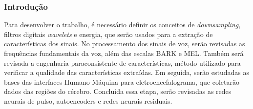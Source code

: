 \begin{frame}
	\frametitle{Introdução}
	\par Para desenvolver o trabalho, é necessário definir os conceitos de \textit{downsampling}, filtros digitais \textit{wavelets} e energia, que serão usados para a extração de características dos sinais. No processamento dos sinais de voz, serão revisadas as frequências fundamentais da voz, além das escalas BARK e MEL. Também será revisada a engenharia paraconsistente de características, método utilizado para verificar a qualidade das características extraídas. Em seguida, serão estudadas as bases das interfaces Humano-Máquina para eletroencefalograma, que coletarão dados das regiões do cérebro. Concluída essa etapa, serão revisadas as redes neurais de pulso, autoencoders e redes neurais residuais.
\end{frame}